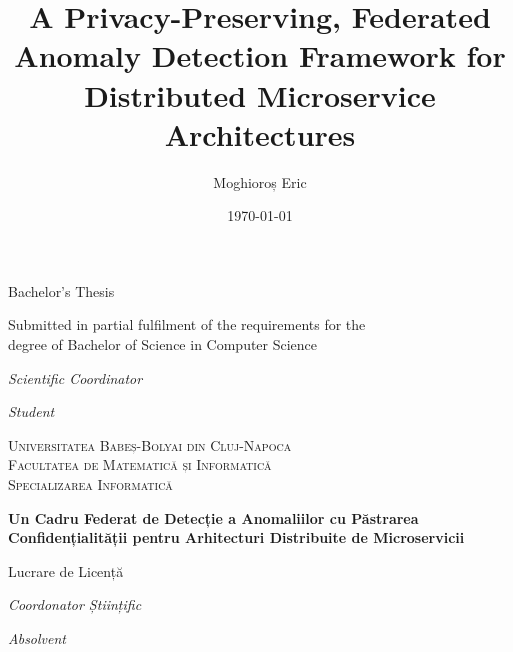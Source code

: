 \documentclass[12pt,a4paper]{report}
\title{A Privacy-Preserving, Federated Anomaly Detection Framework for Distributed Microservice Architectures}
\author{Moghioroș Eric}
\date{\today}
\begin{document}
\makeatletter
\begin{titlepage}
    \centering
    {\scshape \large \@specialization \par}
    \vspace{3cm}
    {\huge\bfseries \@title \par}
    \vspace{2cm}
    {\large Bachelor's Thesis \par}
    {\large Submitted in partial fulfilment of the requirements for the\\degree of Bachelor of Science in Computer Science \par}
    \vfill
    \begin{minipage}{0.48\textwidth}
        \begin{flushleft} \large
            \textit{Scientific Coordinator}\\
            \@supervisor
        \end{flushleft}
    \end{minipage}
    \begin{minipage}{0.48\textwidth}
        \begin{flushright} \large
            \textit{Student}\\
            \@author
        \end{flushright}
    \end{minipage}
    \vfill
    {\large \@date \par}
\end{titlepage}

\begin{titlepage}
    \centering
    {\scshape \large Universitatea Babeș-Bolyai din Cluj-Napoca\\Facultatea de Matematică și Informatică\\Specializarea Informatică \par}
    \vspace{3cm}
    {\huge\bfseries Un Cadru Federat de Detecție a Anomaliilor cu Păstrarea Confidențialității pentru Arhitecturi Distribuite de Microservicii \par}
    \vspace{2cm}
    {\large Lucrare de Licență \par}
    \vfill
    \begin{minipage}{0.48\textwidth}
        \begin{flushleft} \large
            \textit{Coordonator Științific}\\
            \@supervisor
        \end{flushleft}
    \end{minipage}
    \begin{minipage}{0.48\textwidth}
        \begin{flushright} \large
            \textit{Absolvent}\\
            \@author
        \end{flushright}
    \end{minipage}
    \vfill
    {\large \@date \par}
\end{titlepage}
\makeatother
\end{document}
